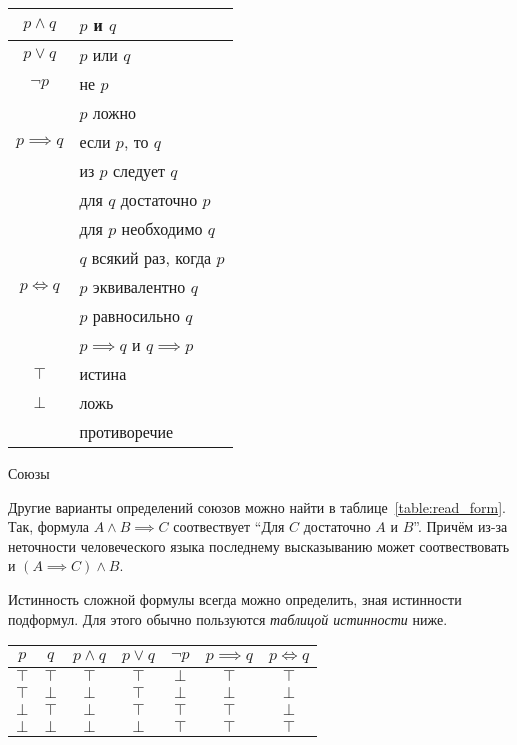 \begin{margintable}[7cm]
  \begin{tabular}{cl}
    $p\land q$    & $p$ и $q$                                   \\\hline
    $p\lor q$     & $p$ или $q$                                 \\\hline
    $\lnot p$     & не $p$                                      \\
                  & $p$ ложно                                   \\ \hline
    $p\implies q$ & если $p$, то $q$                            \\
                  & из $p$ следует $q$                          \\
                  & для $q$ достаточно\index{достаточность} $p$ \\
                  & для $p$ необходимо\index{необходимость} $q$ \\
                  & $q$ всякий раз, когда $p$                   \\\hline
    $p\iff q$     & $p$ эквивалентно $q$                        \\
                  & $p$ равносильно $q$                         \\
                  & $p\implies q$ и $q\implies p$               \\\hline
    $\top$        & истина                                      \\\hline
    $\bot$        & ложь                                        \\
                  & противоречие
  \end{tabular}

  \caption{Союзы}\label{table:read_form}
\end{margintable}

Другие варианты определений союзов можно
найти в таблице~\ref{table:read_form}.
Так, формула ${A\land B\implies C}$
соотвествует ``Для $C$ достаточно $A$ и $B$''.
Причём из-за неточности человеческого языка последнему
высказыванию может соотвествовать и
${(A\implies C)\land B}$.

Истинность сложной формулы всегда можно определить, зная истинности
подформул. Для этого обычно пользуются {\it таблицой истинности} ниже.

\begin{center}
  \begin{tabular}{cc|ccccc}
    $p$    & $q$       & $p\land q$
           & $p\lor q$ & $\lnot p$  & $p\implies q$ & $p\iff q$                   \\\hline
    $\top$ & $\top$    & $\top$     & $\top$        & $\bot$    & $\top$ & $\top$ \\
    $\top$ & $\bot$    & $\bot$     & $\top$        & $\bot$    & $\bot$ & $\bot$ \\
    $\bot$ & $\top$    & $\bot$     & $\top$        & $\top$    & $\top$ & $\bot$ \\
    $\bot$ & $\bot$    & $\bot$     & $\bot$        & $\top$    & $\top$ & $\top$ \\
  \end{tabular}
\end{center}

